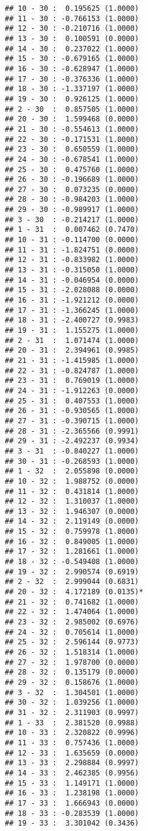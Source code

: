 \documentclass[12pt,]{article}
\begin{document}
\begin{verbatim}
## 10 - 30 :  0.195625 (1.0000)
## 11 - 30 : -0.766153 (1.0000)
## 12 - 30 : -0.210716 (1.0000)
## 13 - 30 :  0.100591 (0.0000)
## 14 - 30 :  0.237022 (1.0000)
## 15 - 30 : -0.679165 (1.0000)
## 16 - 30 : -0.628947 (1.0000)
## 17 - 30 : -0.376336 (1.0000)
## 18 - 30 : -1.337197 (1.0000)
## 19 - 30 :  0.926125 (1.0000)
## 2 - 30  :  0.857505 (1.0000)
## 20 - 30 :  1.599468 (0.0000)
## 21 - 30 : -0.554613 (1.0000)
## 22 - 30 : -0.171531 (1.0000)
## 23 - 30 :  0.650559 (1.0000)
## 24 - 30 : -0.678541 (1.0000)
## 25 - 30 :  0.475760 (1.0000)
## 26 - 30 : -0.196689 (1.0000)
## 27 - 30 :  0.073235 (0.0000)
## 28 - 30 : -0.984203 (1.0000)
## 29 - 30 : -0.989917 (1.0000)
## 3 - 30  : -0.214217 (1.0000)
## 1 - 31  :  0.007462 (0.7470)
## 10 - 31 : -0.114700 (0.0000)
## 11 - 31 : -1.824751 (0.0000)
## 12 - 31 : -0.833982 (1.0000)
## 13 - 31 : -0.315050 (1.0000)
## 14 - 31 : -0.046954 (0.0000)
## 15 - 31 : -2.028088 (0.0000)
## 16 - 31 : -1.921212 (0.0000)
## 17 - 31 : -1.366245 (1.0000)
## 18 - 31 : -2.400727 (0.9983)
## 19 - 31 :  1.155275 (1.0000)
## 2 - 31  :  1.071474 (1.0000)
## 20 - 31 :  2.394961 (0.9985)
## 21 - 31 : -1.415985 (1.0000)
## 22 - 31 : -0.824787 (1.0000)
## 23 - 31 :  0.769019 (1.0000)
## 24 - 31 : -1.912263 (0.0000)
## 25 - 31 :  0.407553 (1.0000)
## 26 - 31 : -0.930565 (1.0000)
## 27 - 31 : -0.390715 (1.0000)
## 28 - 31 : -2.365566 (0.9991)
## 29 - 31 : -2.492237 (0.9934)
## 3 - 31  : -0.840227 (1.0000)
## 30 - 31 : -0.268593 (1.0000)
## 1 - 32  :  2.055898 (0.0000)
## 10 - 32 :  1.988752 (0.0000)
## 11 - 32 :  0.431814 (1.0000)
## 12 - 32 :  1.310037 (1.0000)
## 13 - 32 :  1.946307 (0.0000)
## 14 - 32 :  2.119149 (0.0000)
## 15 - 32 :  0.759978 (1.0000)
## 16 - 32 :  0.849005 (1.0000)
## 17 - 32 :  1.281661 (1.0000)
## 18 - 32 : -0.549408 (1.0000)
## 19 - 32 :  2.990574 (0.6919)
## 2 - 32  :  2.999044 (0.6831)
## 20 - 32 :  4.172189 (0.0135)*
## 21 - 32 :  0.741682 (1.0000)
## 22 - 32 :  1.474064 (1.0000)
## 23 - 32 :  2.985002 (0.6976)
## 24 - 32 :  0.705614 (1.0000)
## 25 - 32 :  2.596144 (0.9773)
## 26 - 32 :  1.518314 (1.0000)
## 27 - 32 :  1.978700 (0.0000)
## 28 - 32 :  0.135179 (0.0000)
## 29 - 32 :  0.158676 (1.0000)
## 3 - 32  :  1.304501 (1.0000)
## 30 - 32 :  1.039256 (1.0000)
## 31 - 32 :  2.311903 (0.9997)
## 1 - 33  :  2.381520 (0.9988)
## 10 - 33 :  2.320822 (0.9996)
## 11 - 33 :  0.757436 (1.0000)
## 12 - 33 :  1.635659 (0.0000)
## 13 - 33 :  2.298884 (0.9997)
## 14 - 33 :  2.462385 (0.9956)
## 15 - 33 :  1.149171 (1.0000)
## 16 - 33 :  1.238198 (1.0000)
## 17 - 33 :  1.666943 (0.0000)
## 18 - 33 : -0.283539 (1.0000)
## 19 - 33 :  3.301042 (0.3436)

\end{verbatim}
\end{document}
